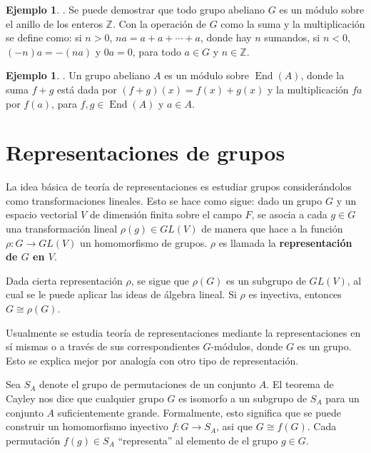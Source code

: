 \documentclass[12pt]{book}
\theoremstyle{definition}
\newtheorem{example}[theorem]{Ejemplo}
\DeclareMathOperator{\End}{End}
\newcounter{in}
\newcounter{ini}
\begin{document}
\begin{example}{.}
  Se puede demostrar que todo grupo abeliano $G$ es un módulo sobre el anillo de los enteros
  $\mathbb{Z}$. Con la operación de $G$ como la suma y la
  multiplicación se define como: si $n>0$, $na=a+a+\cdots+a$, donde
  hay $n$ sumandos, si  $n<0$, $(-n)a=-(na)$ y $0a=0$, para todo $a\in G$ y $n\in \mathbb{Z}$.
\end{example}

\begin{example}{.}
  Un grupo abeliano $A$ es un módulo sobre $\End(A)$, donde la suma
  $f+g$ está dada por $(f+g)(x)=f(x)+g(x)$ y la multiplicación $fa$
  por $f(a)$, para $f,g\in\End(A)$ y $a\in A$. 
\end{example}

\section{Representaciones de grupos}
\label{rep-grup}

La idea básica de teoría de representaciones es estudiar grupos considerándolos como
transformaciones lineales. Esto se hace como sigue: dado un grupo $G$
y un espacio vectorial $V$ de dimensión finita sobre el campo $F$,
se asocia a cada $g\in G$ una transformación lineal $\rho(g)\in GL(V)$ de manera que hace a la
función $\rho:G\rightarrow GL(V)$ un homomorfismo de grupos. $\rho$ es
llamada la \textbf{representación de
  $G$ en $V$}. 

Dada cierta representación $\rho$, se sigue que $\rho(G)$ es un
subgrupo de $GL(V)$, al cual se le puede aplicar las ideas de álgebra
lineal. Si $\rho$ es inyectiva, entonces $G\cong \rho(G)$.

Usualmente se estudia teoría de representaciones mediante la
representaciones en sí mismas o a través de sus correspondientes
$G$-módulos, donde $G$ es un grupo. Esto se explica mejor por analogía con otro tipo de representación.

Sea $S_{A}$ denote el grupo de permutaciones de un conjunto $A$. El
teorema de Cayley nos dice que cualquier grupo $G$ es isomorfo a un
subgrupo de $S_{A}$ para un conjunto $A$ suficientemente
grande. Formalmente, esto significa que se puede construir un
homomorfismo inyectivo $f:G\rightarrow S_{A}$, asi que $G\cong
f(G)$. Cada permutación $f(g)\in S_{A}$ ``representa'' al elemento de el grupo $g\in
G$. 
\end{document}

